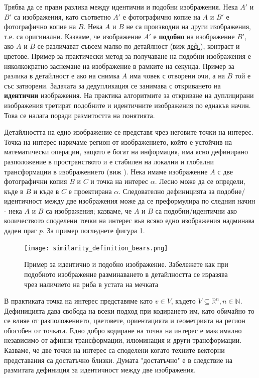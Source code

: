 \documentclass[a4paper,12pt]{article}
\begin{document}
\bigbreak

Трябва да се прави разлика между идентични и подобни изображения. Нека $A'$ и $B'$ са изображения, като съответно $A'$ е фотографично копие на $A$ и $B'$ е фотографично копие на $B$. Нека $A$ и $B$ не са производни на други изображения, т.е. са оригинални. Казваме, че изображение $A'$ е \textbf{подобно} на изображение $B'$, ако $A$ и $B$ се различават съвсем малко по детайлност (виж \hyperref[def:imdetail]{деф.}), контраст и цветове. Пример за практически метод за получаване на подобни изображения е няколкократно заснемане на изображение в рамките на секунда. Пример за разлика в детайлност е ако на снимка $A$ има човек с отворени очи, а на $B$ той е със затворени. Задачата за дедупликация се занимава с откриването на \textbf{идентични} изображения. На практика алгоритмите за откриване на дуплицирани изображения третират подобните и идентичните изображения по еднакъв начин. Това се налага поради размитостта на понятията. 

\bigbreak

\label{def:imdetail}Детайлността на едно изображение се представя чрез неговите точки на интерес. Точка на интерес наричаме регион от изображението, който е устойчив на математически операции, защото е богат на информация, има ясно дефинирано разположение в пространството и е стабилен на локални и глобални трансформации в изображението (виж \cite{sift}). Нека имаме изображение $A$ с две фотографични копия $B$ и $C$ и точка на интерес $\alpha$. Лесно може да се определи, къде в $B$ и къде в $C$ е проектирана $\alpha$. Следователно дефиницията за подобие/идентичност между две изображения може да се преформулира по следния начин - нека $A$ и $B$ са изображения; казваме, че $A$ и $B$ са подобни/идентични ако количеството споделени точки на интерес във всяко едно изображения надминава даден праг $p$. За пример погледнете фигура \ref{fig:similaritydefbears}.

\begin{figure}[h]
    \centering
    \texttt{[image: similarity\_definition\_bears.png]}
    \caption{Пример за идентично и подобно изображение. Забележете как при подобното изображение разминаването в детайлността се изразява чрез наличието на риба в устата на мечката}
    \label{fig:similaritydefbears}
\end{figure}

\bigbreak

В практиката точка на интерес представяме като $v \in V$, където $V \subseteq \mathbb{R}^n, n \in \mathbb{N}$. Дефиницията дава свобода на всеки подход при кодирането им, като обичайно то се влияе от разположението, цветовете, ориентацията и геометрията на регион обособен от точката. Едно добро кодиране на точна на интерес е максимално независимо от афинни трансформации, илюминация и други трансформации. Казваме, че две точки на интерес са споделени когато техните векторни представания са достатъчно близки. Думата "достатъчно" е в следствие на размитата дефиниция за идентичност между две изображения.
\end{document}
